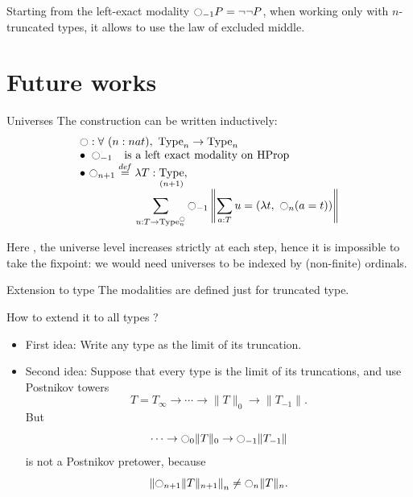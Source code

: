 \documentclass{beamer}
\newcommand \defeq {\overset{de\hspace{-0.2ex}f}{=}}
\DeclareMathOperator{\Type}{Type}
\DeclareMathOperator{\HProp}{HProp}
\newcommand{\modal}{\ensuremath{\ocircle}}
\newcommand{\nType}[1]{\Type_{#1}}
\begin{document}
\begin{frame}

  \note{ }
  Starting from the left-exact modality $\modal_{-1} P = \lnot\lnot
  P$, when working only with $n$-truncated types, it allows to use the
  law of excluded middle.

\end{frame}

\section{Future works}
\label{sec:fw}
\begin{frame}{Universes}
  The construction can be written inductively:
  \[ \begin{array}{l}
    \modal : \forall \ (n : nat), \ \nType n \to \nType n 
    \\
    \bullet~\modal_{-1\phantom{n}} \text{ is a left exact modality on
      $\HProp$} \\
    \bullet~\displaystyle{\modal_{n+1} \defeq  \lambda T:\nType {(n+1)}},\\
    \hspace{5em} \displaystyle{\sum_{u:T \to \nType n^\modal} \modal_{-1} 
      \left\|
        \sum_{a:T} u= (\lambda t,~\modal_n (a=t))
      \right\|}
  \end{array}
  \]

  Here , the universe level increases strictly at each step, hence it is
  impossible to take the fixpoint: we would need universes to be
  indexed by (non-finite) ordinals.

\end{frame}

\begin{frame}{Extension to type}
  The modalities are defined just for truncated type.

  \bigskip

  How to extend it to all types ?
\end{frame}

\begin{frame}
  \begin{itemize}
  \item<1-> First idea: Write any type as the limit of its
    truncation. 
  \item<3-> Second idea: Suppose that every type is the limit of
    its truncations, and use Postnikov towers
    \[ T = T_\infty \to \cdots \to \|T\|_0 \to \|T_{-1}\|.\]
    But
    \[  \cdots \to \modal_0\|T\|_0 \to \modal_{-1} \|T_{-1}\|\]
    is not a Postnikov pretower, because
    \[  \left\|\modal_{n+1} \|T\|_{n+1}\right\|_{n} \not= \modal_n
    \|T\|_n.\]
  \end{itemize}
\end{frame}
\end{document}
